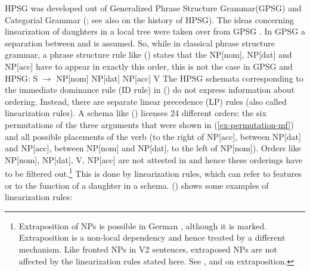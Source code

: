 \documentclass[output=paper,biblatex,babelshorthands,newtxmath,draftmode,colorlinks,citecolor=brown]{langscibook}
\begin{document}
HPSG was developed out of Generalized Phrase Structure Grammar\indexgpsg (GPSG) and Categorial\indexcg
  Grammar (\citealp{Ajdukiewicz35a-u,Pollard84a-u,Steedman2000a-u}; see also  on the
history of HPSG). The ideas concerning linearization of
daughters in a local tree were taken over from GPSG \citep*[Section~3.2]{GKPS85a}. In GPSG a separation between
 and  is assumed. So, while in classical phrase structure
grammar, a phrase structure rule like () states that the NP[nom], NP[dat] and NP[acc] have to
appear in exactly this order, this is not the case in GPSG and HPSG:
\ea
\label{rule-s-np-np-np-v}
S $\to$ NP[nom] NP[dat] NP[acc] V
\z
The HPSG schemata corresponding to the immediate dominance rule (ID rule) in () do not express information
about ordering. Instead, there are separate linear precedence (LP) rules
(also called linearization rules). A schema like () licenses 24 
different orders: the six permutations of the three arguments that were shown in
(\ref{ex-permutation-mf}) and all possible placements of the verb (to the right of NP[acc], between
NP[dat] and NP[acc], between NP[nom] and NP[dat], to the left of NP[nom]). Orders like NP[nom],
NP[dat], V, NP[acc] are not attested in  and hence these orderings have to be filtered
out.\footnote{
Extraposition of NPs is possible in German \textcites[Section~13.1.1.3, 13.1.2.3]{Mueller99a}[ix--xi]{Mueller2002b}, although it is marked. Extraposition is a non-local
dependency and hence treated by a different mechanism. Like fronted NPs in V2 sentences, extraposed NPs are not affected by the
linearization rules stated here. See ,  and  on extraposition.
} This is done by linearization rules, which can refer to features or to the function of a
daughter in a schema. () shows some examples of linearization rules:
\end{document}
